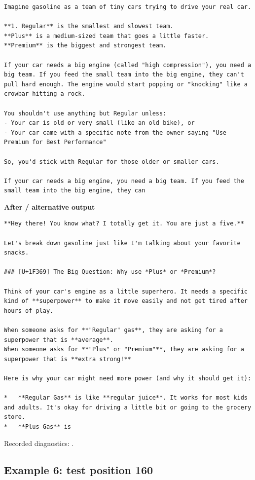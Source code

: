 \begin{Verbatim}
Imagine gasoline as a team of tiny cars trying to drive your real car.

**1. Regular** is the smallest and slowest team.
**Plus** is a medium-sized team that goes a little faster.
**Premium** is the biggest and strongest team.

If your car needs a big engine (called "high compression"), you need a big team. If you feed the small team into the big engine, they can't pull hard enough. The engine would start popping or "knocking" like a crowbar hitting a rock.

You shouldn't use anything but Regular unless:
- Your car is old or very small (like an old bike), or
- Your car came with a specific note from the owner saying "Use Premium for Best Performance"

So, you'd stick with Regular for those older or smaller cars.

If your car needs a big engine, you need a big team. If you feed the small team into the big engine, they can
\end{Verbatim}

\textbf{After / alternative output}

\begin{Verbatim}
**Hey there! You know what? I totally get it. You are just a five.**

Let's break down gasoline just like I'm talking about your favorite snacks.

### [U+1F369] The Big Question: Why use *Plus* or *Premium*?

Think of your car's engine as a little superhero. It needs a specific kind of **superpower** to make it move easily and not get tired after hours of play.

When someone asks for **"Regular" gas**, they are asking for a superpower that is **average**.
When someone asks for **"Plus" or "Premium"**, they are asking for a superpower that is **extra strong!**

Here is why your car might need more power (and why it should get it):

*   **Regular Gas** is like **regular juice**. It works for most kids and adults. It's okay for driving a little bit or going to the grocery store.
*   **Plus Gas** is
\end{Verbatim}

Recorded diagnostics:
\texttt{}.

\subsection{Example 6: test position
160}\label{record-docs-watermarking-qualitative-text-latent-smoothing-md-example-6-test-position-160}

